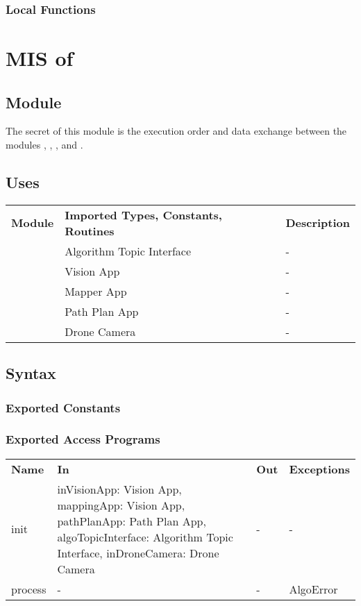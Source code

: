 \documentclass[12pt, titlepage]{article}
\begin{document}
\subsubsection{Local Functions}
\newpage





\section{MIS of } \label{MIS_ALGORITHM_APP} 
\subsection{Module}
The secret of this module is the execution order and data exchange between the modules , , , and . 
\subsection{Uses}
\begin{center}
\begin{tabular}{p{2 cm} p{5cm} p{6.5cm} } 
\hline
\textbf{Module} & \textbf{Imported Types, Constants, Routines} & \textbf{Description} \\
\nameref{Algorithm Topic Interface} & Algorithm Topic Interface & - \\
\nameref{Vision App} & Vision App  & - \\
\nameref{Mapper App} & Mapper App  & - \\
\nameref{Path Plan App} & Path Plan App  & - \\
\nameref{Drone Camera} & Drone Camera  & - \\
\hline
\hline
\end{tabular}
\end{center}
\subsection{Syntax}
\subsubsection{Exported Constants}
\subsubsection{Exported Access Programs}
\begin{center}
\begin{tabular}{p{3.5cm} p{2.5cm} p{2.5cm} p{5cm}}
\hline
\textbf{Name} & \textbf{In} & \textbf{Out} & \textbf{Exceptions} \\
init & inVisionApp: Vision App, mappingApp: Vision App, pathPlanApp: Path Plan App, algoTopicInterface: Algorithm Topic Interface, inDroneCamera: Drone Camera  & - & - \\
process & -  & - & AlgoError \\
\hline
\hline
\end{tabular}
\end{center}
\end{document}
